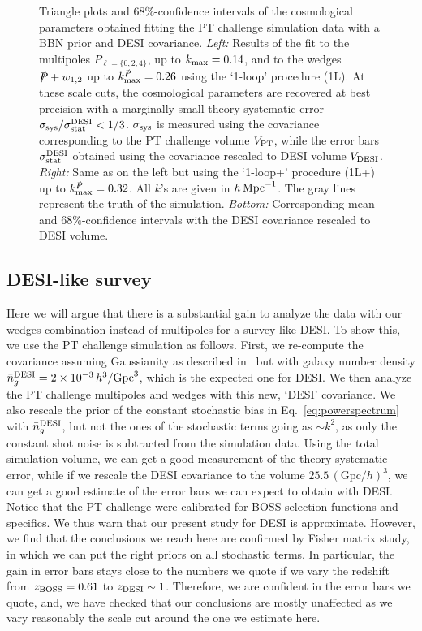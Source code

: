 \documentclass[12pt,a4paper]{article}
\def\hinvMpc{h\,{\rm Mpc}^{-1}}
\def\PA{\slashed{P}}
\renewcommand{\(}{\left(}
\renewcommand{\)}{\right)}
\begin{document}
{\begin{figure}[ht!]
\caption{\small Triangle plots and $68\%$-confidence intervals of the cosmological parameters obtained fitting the PT challenge simulation data with a BBN prior and DESI covariance. 
{\it Left:} Results of the fit to the multipoles $P_{\ell=\{0,2,4\}}$, up to $k_{\rm max} = 0.14$, and to the wedges $\PA + w_{1,2}$ up to $k_{\rm max}^{\PA} = 0.26$ using the `1-loop' procedure (1L).
At these scale cuts, the cosmological parameters are recovered at best precision with a marginally-small theory-systematic error $\sigma_{\rm sys}/\sigma_{\rm stat}^{\rm DESI} < 1/3$. 
$\sigma_{\rm sys}$ is measured using the covariance corresponding to the PT challenge volume $V_{\rm PT}$, while the error bars $\sigma_{\rm stat}^{\rm DESI}$ obtained using the covariance rescaled to DESI volume $V_{\rm DESI}$. 
{\it Right:} Same as on the left but using the `1-loop+' procedure (1L+) up to $k_{\rm max}^{\PA} = 0.32$. 
All $k$'s are given in $\hinvMpc$. 
The gray lines represent the truth of the simulation. 
{\it Bottom: } Corresponding mean and $68\%$-confidence intervals with the DESI covariance rescaled to DESI volume.  
} \label{fig:desi} 
\end{figure}

\subsection{DESI-like survey}
Here we will argue that there is a substantial gain to analyze the data with our wedges combination instead of multipoles for a survey like DESI. 
To show this, we use the PT challenge simulation as follows. 
First, we re-compute the covariance assuming Gaussianity as described in~\cite{Nishimichi:2020tvu} but with galaxy number density $\bar{n}_g^{\rm DESI} = 2 \times 10^{-3} \, h^3/\textrm{Gpc}^3$, which is the expected {one for} DESI. 
We then analyze the PT challenge multipoles and wedges with this new, `DESI' covariance. 
We also rescale the prior of the constant stochastic bias in Eq.~\eqref{eq:powerspectrum} with $\bar{n}_g^{\rm DESI}$, but not the ones of the stochastic terms going as $\sim k^2$, as only the constant shot noise is subtracted from the simulation data. 
Using the total simulation volume, we can get a good measurement of the theory-systematic error, while if we rescale the DESI covariance to the volume $25.5 \,(\textrm{Gpc}/h)^3$, we can get a good estimate of the error bars we can expect to obtain with DESI. 
Notice that the PT challenge were calibrated for BOSS selection functions and specifics. 
We thus warn that our present study for DESI is approximate. 
However, we find that the conclusions we reach here are confirmed by Fisher matrix study, in which we can put the right priors on all stochastic terms. 
In particular, the gain in error bars stays close to the numbers we quote if we vary the redshift from $z_{\rm BOSS}=0.61$ to $z_{\rm DESI} \sim 1$. 
Therefore, we are confident in the error bars we quote, and, we have checked that our conclusions are mostly unaffected as we vary reasonably the scale cut around the one we estimate here. 

}
\end{document}
